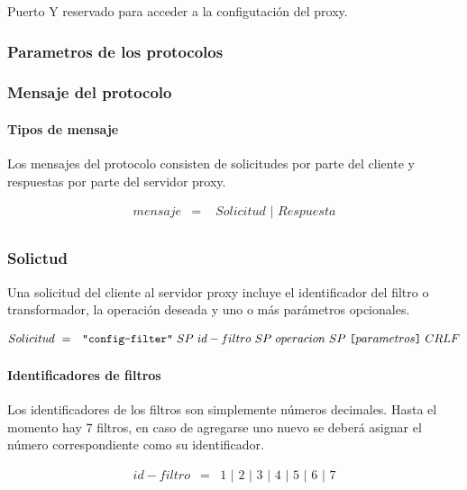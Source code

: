 \documentclass[a4paper,10pt]{article}
\begin{document}
    Puerto Y reservado para acceder a la configutaci\'on del proxy.

        \subsubsection{Parametros de los protocolos}


        \subsubsection{Mensaje del protocolo}

            \paragraph*{Tipos de mensaje}
            Los mensajes del protocolo consisten de solicitudes por parte del cliente y respuestas por parte del servidor proxy.

            \begin{eqnarray*}
                mensaje  & = &\,\,Solicitud\,\,|\,\,Respuesta\nonumber\\
            \end{eqnarray*}


        \subsubsection{Solictud}
        Una solicitud del cliente al servidor proxy incluye el identificador del filtro o transformador, la operaci\'on deseada y uno o m\'as par\'ametros opcionales.

        \begin{eqnarray*}
                Solicitud\ & = & \verb+"config-filter"+\,\,SP\,\,id-filtro\,\,SP\,\,operacion\,\,SP\,\,\verb+[+parametros\verb+]+\,\,CRLF\nonumber\\
        \end{eqnarray*}

            \paragraph*{Identificadores de filtros}
            Los identificadores de los filtros son simplemente n\'umeros decimales. Hasta el momento hay 7 filtros, en caso de agregarse uno nuevo se deber\'a 
            asignar el n\'umero correspondiente como su identificador.

            \begin{eqnarray*}
                id-filtro & = & 1\,\,|\,\,2\,\,|\,\,3\,\,|\,\,4\,\,|\,\,5\,\,|\,\,6\,\,|\,\,7\nonumber\\
            \end{eqnarray*}
            
\end{document}
